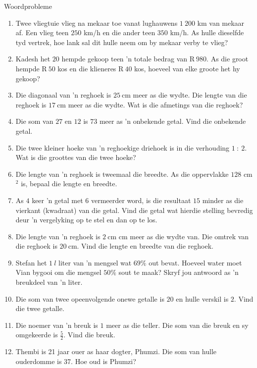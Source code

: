 \begin{exercises}{Woordprobleme}
{
\begin{enumerate}[noitemsep, label=\textbf{\arabic*}. ] 
\item Twee vliegtuie vlieg na mekaar toe vanat lughauwens $1~200$ km van mekaar af. Een vlieg teen $250$ km/h en die ander teen $350$ km/h. As hulle dieselfde tyd vertrek, hoe lank sal dit hulle neem om by mekaar verby te vlieg?
\item Kadesh het $20$ hempde gekoop teen 'n totale bedrag van R$~980$. As die groot hempde R$~50$ kos en die klieneres R$~40$ kos, hoeveel van elke groote het hy gekoop?
\item Die diagonaal van ’n reghoek is $25~$cm meer as die wydte. Die lengte van die reghoek is $17~$cm meer as die wydte. Wat is die afmetings van die reghoek?  
\item Die som van $27$ en $12$ is $73$ meer as ’n onbekende getal. Vind die onbekende getal.
\item Die twee kleiner hoeke van ’n reghoekige driehoek is in die verhouding $1~:~2$. Wat is die groottes van die
twee hoeke?
\item Die lengte van 'n reghoek is tweemaal die breedte. As die oppervlakke $128$ cm$^{2}$ is, bepaal die lengte en breedte.       
\item As $4$ keer ’n getal met $6$ vermeerder word, is die resultaat $15$ minder as die vierkant (kwadraat) van die
getal. Vind die getal wat hierdie stelling bevredig deur ’n vergelyking op te stel en dan op te los.
\item Die lengte van ’n reghoek is $2~$cm cm meer as die wydte van. Die omtrek van die reghoek is  $20~$cm. Vind die lengte en breedte van die reghoek.
\item Stefan het $1~l$ liter van ’n mengsel wat $69\%$ out bevat. Hoeveel water moet Vian bygooi om die mengsel $50\%$ sout te maak? Skryf jou antwoord as ’n breukdeel van ’n liter.
\item Die som van twee opeenvolgende onewe getalle is $20$ en hulle verskil is $2$. Vind die twee getalle.
\item Die noemer van 'n breuk is $1$ meer as die teller. Die som van die breuk en sy omgekeerde is $\frac{5}{2}$. Vind die breuk.
\item Thembi is 21 jaar ouer as haar dogter, Phumzi. Die som van hulle ouderdomme is 37. Hoe oud is Phumzi?

\end{enumerate}}
\end{exercises}
